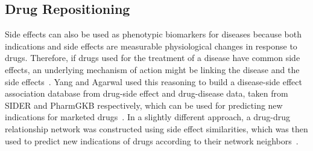 \subsection{Drug Repositioning}

Side effects can also be used as phenotypic biomarkers for diseases because both indications and side effects are measurable physiological changes in response to drugs.
Therefore, if drugs used for the treatment of a disease have common side effects, an underlying mechanism of action might be linking the disease and the side effects~\cite{yang_systematic_2011}.
Yang and Agarwal used this reasoning to build a disease-side effect association database from drug-side effect and drug-disease data, taken from \ac{SIDER} and PharmGKB respectively, which can be used for predicting new indications for marketed drugs~\cite{yang_systematic_2011}.
In a slightly different approach, a drug-drug relationship network was constructed using side effect similarities, which was then used to predict new indications of drugs according to their network neighbors~\cite{ye_construction_2014}.

